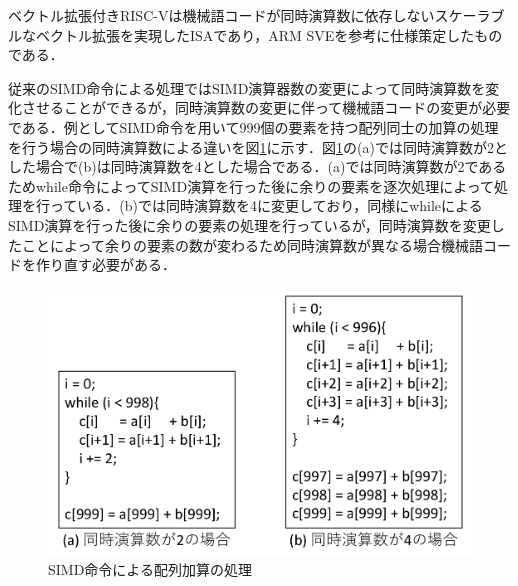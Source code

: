 
ベクトル拡張付きRISC-Vは機械語コードが同時演算数に依存しないスケーラブルなベクトル拡張を実現したISAであり，ARM SVEを参考に仕様策定したものである．

従来のSIMD命令による処理ではSIMD演算器数の変更によって同時演算数を変化させることができるが，同時演算数の変更に伴って機械語コードの変更が必要である．例としてSIMD命令を用いて999個の要素を持つ配列同士の加算の処理を行う場合の同時演算数による違いを図\ref{fig:SIMD_ex}に示す．図\ref{fig:SIMD_ex}の(a)では同時演算数が2とした場合で(b)は同時演算数を4とした場合である．(a)では同時演算数が2であるためwhile命令によってSIMD演算を行った後に余りの要素を逐次処理によって処理を行っている．(b)では同時演算数を4に変更しており，同様にwhileによるSIMD演算を行った後に余りの要素の処理を行っているが，同時演算数を変更したことによって余りの要素の数が変わるため同時演算数が異なる場合機械語コードを作り直す必要がある．

\begin{figure}[tb]
    \centering
    \includegraphics[scale=0.6]{image/SIMD_example.pdf}
    \caption{SIMD命令による配列加算の処理}
    \label{fig:SIMD_ex}
\end{figure}

